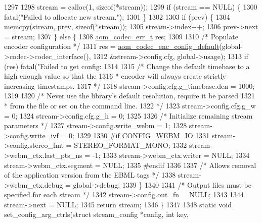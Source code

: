 \begin{DoxyCodeInclude}
{{{{{{{{{{{{{{{1297 
1298   stream = calloc(1, \textcolor{keyword}{sizeof}(*stream));
1299   \textcolor{keywordflow}{if} (stream == NULL) \{
1300     fatal(\textcolor{stringliteral}{"Failed to allocate new stream."});
1301   \}
1302 
1303   \textcolor{keywordflow}{if} (prev) \{
1304     memcpy(stream, prev, \textcolor{keyword}{sizeof}(*stream));
1305     stream->index++;
1306     prev->next = stream;
1307   \} \textcolor{keywordflow}{else} \{
1308     \hyperlink{group__codec_gaaae61e0f8663e6137f1e228757248e7c}{aom\_codec\_err\_t} res;
1309 
1310     \textcolor{comment}{/* Populate encoder configuration */}
1311     res = \hyperlink{group__encoder_gabe456ab6f99bdebc47018779b75d2521}{aom\_codec\_enc\_config\_default}(global->codec->codec\_interface(),
1312                                        &stream->config.cfg, global->usage);
1313     \textcolor{keywordflow}{if} (res) fatal(\textcolor{stringliteral}{"Failed to get config: %
1314 
1315     \textcolor{comment}{/* Change the default timebase to a high enough value so that the}
1316 \textcolor{comment}{     * encoder will always create strictly increasing timestamps.}
1317 \textcolor{comment}{     */}
1318     stream->config.cfg.g\_timebase.den = 1000;
1319 
1320     \textcolor{comment}{/* Never use the library's default resolution, require it be parsed}
1321 \textcolor{comment}{     * from the file or set on the command line.}
1322 \textcolor{comment}{     */}
1323     stream->config.cfg.g\_w = 0;
1324     stream->config.cfg.g\_h = 0;
1325 
1326     \textcolor{comment}{/* Initialize remaining stream parameters */}
1327     stream->config.write\_webm = 1;
1328     stream->config.write\_ivf = 0;
1329 
1330 \textcolor{preprocessor}{#if CONFIG\_WEBM\_IO}
1331     stream->config.stereo\_fmt = STEREO\_FORMAT\_MONO;
1332     stream->webm\_ctx.last\_pts\_ns = -1;
1333     stream->webm\_ctx.writer = NULL;
1334     stream->webm\_ctx.segment = NULL;
1335 \textcolor{preprocessor}{#endif}
1336 
1337     \textcolor{comment}{/* Allows removal of the application version from the EBML tags */}
1338     stream->webm\_ctx.debug = global->debug;
1339   \}
1340 
1341   \textcolor{comment}{/* Output files must be specified for each stream */}
1342   stream->config.out\_fn = NULL;
1343 
1344   stream->next = NULL;
1345   \textcolor{keywordflow}{return} stream;
1346 \}
1347 
1348 \textcolor{keyword}{static} \textcolor{keywordtype}{void} set\_config\_arg\_ctrls(\textcolor{keyword}{struct} stream\_config *config, \textcolor{keywordtype}{int} key,
}}}}}}}}}}}}}}}}
\end{DoxyCodeInclude}

